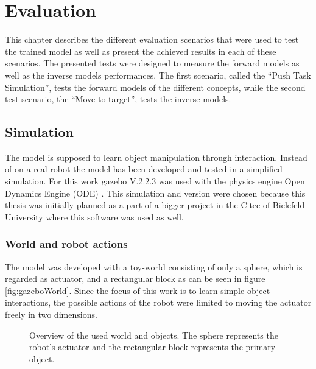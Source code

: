 \chapter{Evaluation\label{chap:evaluation}}



This chapter describes the different evaluation scenarios that were used to test the trained model 
as well as present the achieved results in each of these scenarios. The presented tests were 
designed to measure the forward models as well as the inverse models performances. The first 
scenario, called the \enquote{Push Task Simulation}, tests the forward models of the different 
concepts, while the second test scenario, the \enquote{Move to target}, tests the inverse models.


\section{Simulation\label{sec:simulation}}

The model is supposed to learn object manipulation through interaction. Instead of on a real robot the model has been developed and tested in a simplified simulation. For this work gazebo \cite{gazebo} V.2.2.3 was used with the physics engine Open Dynamics Engine (ODE) \cite{ode}. This simulation and version were chosen because this thesis was initially planned as a part of a bigger project in the Citec of Bielefeld University where this software was used as well. 

\subsection{World and robot actions}%

The model was developed with a toy-world consisting of only a sphere, which is 
regarded as actuator, and a rectangular block as can be seen in figure 
\ref{fig:gazeboWorld}.
Since the focus of this work is to learn simple object interactions, the 
possible actions of the robot were limited to moving the actuator freely in two 
dimensions.

\begin{figure} %
	\caption{Overview of the used world and objects. The sphere represents the 
		robot's actuator and the rectangular block represents the primary object.}
	\label{fig:gazeboWOrld}
\end{figure}



